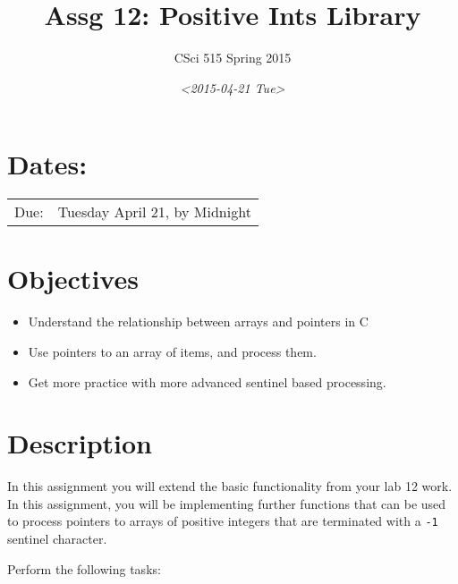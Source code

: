 \documentclass[11pt]{article}
\author{CSci 515 Spring 2015}
\date{\textit{<2015-04-21 Tue>}}
\title{Assg 12: Positive Ints Library}
\begin{document}
\maketitle

\section*{Dates:}
\label{sec-1}
\begin{center}
\begin{tabular}{ll}
Due: & Tuesday April 21, by Midnight\\
\end{tabular}
\end{center}
\section*{Objectives}
\label{sec-2}
\begin{itemize}
\item Understand the relationship between arrays and pointers in C
\item Use pointers to an array of items, and process them.
\item Get more practice with more advanced sentinel based processing.
\end{itemize}
\section*{Description}
\label{sec-3}
In this assignment you will extend the basic functionality from your
lab 12 work.  In this assignment, you will be implementing further
functions that can be used to process pointers to arrays of
positive integers that are terminated with a \verb~-1~ sentinel
character.

Perform the following tasks:
\end{document}
